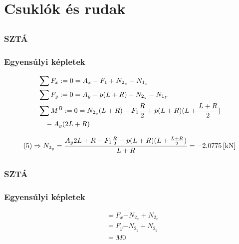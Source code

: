 \section{Csuklók és rudak}

\subsection{}

\subsubsection{SZTÁ}

\subsubsection{Egyensúlyi képletek}
\begin{align}
    &\sum{F_x} := 0 = A_x - F_1 + N_{2_x} + N_{1_x} \\
    &\sum{F_y} := 0 = A_y - p(L+R) - N_{2_y} - N_{1_Y} \\
    &\sum{M^B} := 0 = N_{2_y}(L+R) + F_1 \frac{R}{2} + p(L+R)(L+\frac{L+R}{2}) \nonumber \\
    &\quad - A_y (2L+R)
\end{align}

\begin{equation}
	(5) \Rightarrow N_{2_y} = \frac{A_y{2L+R} - F_1 \frac{R}{2} - p(L+R)(L+\frac{L+R}{2})}{L+R} = \SI{-2.0775}{[\kilo\newton]}
\end{equation}

\newpage

\subsection{}

\subsubsection{SZTÁ}

\subsubsection{Egyensúlyi képletek}
\begin{align}
    &\equal{F_x}{- N_{2_x} + N_{2_x}} \\
    &\equal{F_y}{- N_{2_y} + N_{2_y}} \\
    &\equal{M}{0}
\end{align}

